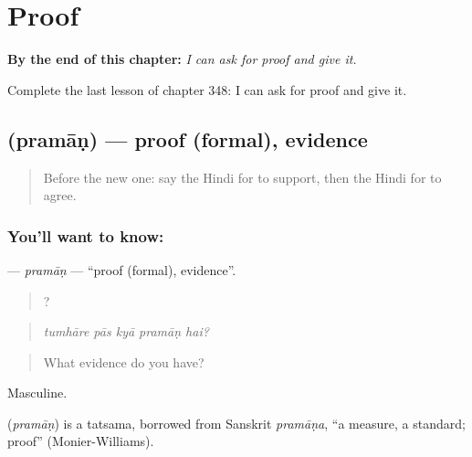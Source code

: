 
\chapter{Proof}
\label{ch:hi-proof}

\begin{chapteropening}
\textbf{By the end of this chapter:} \emph{I can ask for proof and give it.}

Complete the last lesson of chapter 348: I can ask for proof and give it.
\end{chapteropening}

\section[\texorpdfstring{\hi{प्रमाण} (pramāṇ)}{प्रमाण (pramāṇ)}]{ (pramāṇ) — proof (formal), evidence}

\label{lesson:HI-C348-praman}



\begin{quote}
Before the new one: say the Hindi for to support, then the Hindi for to agree.
\end{quote}

\subsection*{You'll want to know: }
\textbf{} — \emph{pramāṇ} — \textquotedblleft{}proof (formal), evidence\textquotedblright{}.

\begin{quote}
    ?
\end{quote}

\begin{quote}
\emph{tumhāre pās kyā pramāṇ hai?}
\end{quote}

\begin{quote}
What evidence do you have?
\end{quote}

Masculine.

\begin{cousinweb}
\textbf{} (\emph{pramāṇ}) is a tatsama, borrowed from Sanskrit \emph{pramāṇa}, \textquotedblleft{}a measure, a standard; proof\textquotedblright{} (Monier-Williams).
\end{cousinweb}

